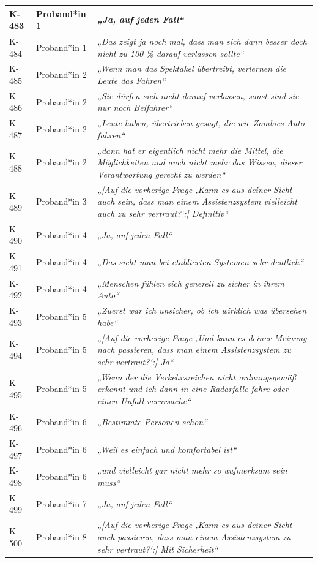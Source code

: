 {\begin{xltabular}{\textwidth}{
    |P{0.10\textwidth}
    |P{0.17\textwidth}
    |Y|
}
K-483 & Proband*in 1 & \textit{„Ja, auf jeden Fall“} \\
\hline
K-484 & Proband*in 1 & \textit{„Das zeigt ja noch mal, dass man sich dann besser doch nicht zu 100 \% darauf verlassen sollte“} \\
\hline
K-485 & Proband*in 2 & \textit{„Wenn man das Spektakel übertreibt, verlernen die Leute das Fahren“} \\
\hline
K-486 & Proband*in 2 & \textit{„Sie dürfen sich nicht darauf verlassen, sonst sind sie nur noch Beifahrer“} \\
\hline
K-487 & Proband*in 2 & \textit{„Leute haben, übertrieben gesagt, die wie Zombies Auto fahren“} \\
\hline
K-488 & Proband*in 2 & \textit{„dann hat er eigentlich nicht mehr die Mittel, die Möglichkeiten und auch nicht mehr das Wissen, dieser Verantwortung gerecht zu werden“} \\
\hline
K-489 & Proband*in 3 & \textit{„[Auf die vorherige Frage ‚Kann es aus deiner Sicht auch sein, dass man einem Assistenzsystem vielleicht auch zu sehr vertraut?‘:] Definitiv“} \\
\hline
K-490 & Proband*in 4 & \textit{„Ja, auf jeden Fall“} \\
\hline
K-491 & Proband*in 4 & \textit{„Das sieht man bei etablierten Systemen sehr deutlich“} \\
\hline
K-492 & Proband*in 4 & \textit{„Menschen fühlen sich generell zu sicher in ihrem Auto“} \\
\hline
K-493 & Proband*in 5 & \textit{„Zuerst war ich unsicher, ob ich wirklich was übersehen habe“} \\
\hline
K-494 & Proband*in 5 & \textit{„[Auf die vorherige Frage ‚Und kann es deiner Meinung nach passieren, dass man einem Assistenzsystem zu sehr vertraut?‘:] Ja“} \\
\hline
K-495 & Proband*in 5 & \textit{„Wenn der die Verkehrszeichen nicht ordnungsgemäß erkennt und ich dann in eine Radarfalle fahre oder einen Unfall verursache“} \\
\hline
K-496 & Proband*in 6 & \textit{„Bestimmte Personen schon“} \\
\hline
K-497 & Proband*in 6 & \textit{„Weil es einfach und komfortabel ist“} \\
\hline
K-498 & Proband*in 6 & \textit{„und vielleicht gar nicht mehr so aufmerksam sein muss“} \\
\hline
K-499 & Proband*in 7 & \textit{„Ja, auf jeden Fall“} \\
\hline
K-500 & Proband*in 8 & \textit{„[Auf die vorherige Frage ‚Kann es aus deiner Sicht auch passieren, dass man einem Assistenzsystem zu sehr vertraut?‘:] Mit Sicherheit“} \\

\end{xltabular}}
